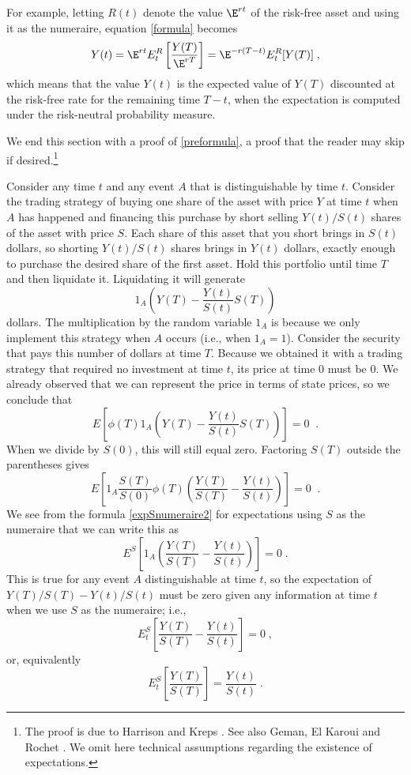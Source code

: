 For example, letting $R(t)$ denote the value $\E^{rt}$ of the risk-free asset and using it as the numeraire, equation \eqref{formula} becomes
\begin{equation}\label{riskneutralformula}
Y(t) = \E^{rt}E^R_t\left[\frac{Y(T)}{\E^{rT}}\right] = \E^{-r(T-t)}E^R_t [Y(T)]\;,
\end{equation}
which means that the value $Y(t)$ is the expected value of $Y(T)$ discounted at the risk-free rate for the remaining time $T\!-\!t$, when the expectation is computed under the risk-neutral probability measure.

We end this section with a proof of \eqref{preformula}, a proof that the reader may skip if desired.\footnote{The proof is due to Harrison and Kreps \cite{HK}.  See also Geman, El Karoui and Rochet \cite{GKR}.  We omit here technical assumptions regarding the existence of expectations.}  

\begin{petit} Consider any time $t$ and any event $A$ that is distinguishable by time $t$.  Consider the trading strategy of buying one share of the asset with price $Y$ at time $t$ when $A$ has happened and financing this purchase by short selling $Y(t)/S(t)$ shares of the asset with price $S$.  Each share of this asset that you short brings in $S(t)$ dollars, so shorting $Y(t)/S(t)$ shares brings in $Y(t)$ dollars, exactly enough to purchase the desired share of the first asset.  Hold this portfolio until time $T$ and then liquidate it.  Liquidating it will generate 
$$1_A\left(Y(T)-\frac{Y(t)}{S(t)}S(T)\right)$$
dollars.  The multiplication by the random variable $1_A$ is because we only implement this strategy when $A$ occurs (i.e., when $1_A=1$).  Consider the security that pays this number of dollars at time $T$.  Because we obtained it with a trading strategy that required no investment at time $t$, its price at time 0 must be 0.  We already observed that we can represent the price in terms of state prices, so we conclude that
$$E \left[\phi(T)1_A\left(Y(T)-\frac{Y(t)}{S(t)}S(T)\right)\right] = 0\;\;.$$
When we divide by $S(0)$, this will still equal zero.  Factoring $S(T)$ outside the parentheses gives
$$E \left[1_A\frac{S(T)}{S(0)}\phi(T)\left(\frac{Y(T)}{S(T)}-\frac{Y(t)}{S(t)}\right)\right] = 0\;\;.$$
We see from the formula \eqref{expSnumeraire2} for expectations using $S$ as the numeraire that we can write this as
$$E^S\left[1_A\left(\frac{Y(T)}{S(T)}-\frac{Y(t)}{S(t)}\right)\right]=0\;.$$
This is true for any event $A$ distinguishable at time $t$, so the expectation of $Y(T)/S(T)-Y(t)/S(t)$ must be zero given any information at time $t$ when we use $S$ as the numeraire; i.e.,
$$E^S_t\left[\frac{Y(T)}{S(T)}-\frac{Y(t)}{S(t)}\right]=0\; ,$$
or, equivalently
$$E^S_t\left[\frac{Y(T)}{S(T)}\right] = \frac{Y(t)}{S(t)}\;.$$
\end{petit}

